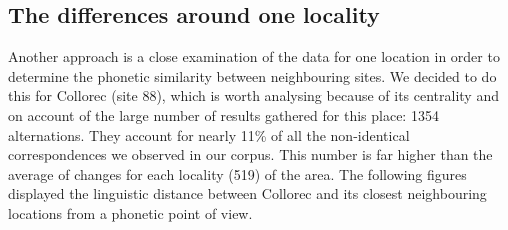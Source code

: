 \documentclass[output=paper]{LSP/langsci}
\begin{document}
\subsection[The differences around one locality]{The differences around one locality}

Another approach is a close examination of the data for one location in order to determine the phonetic similarity between neighbouring sites. We decided to do this for Collorec (site 88), which is worth analysing because of its centrality and on account of the large number of results gathered for this place: 1354 alternations. They account for nearly 11\% of all the non-identical correspondences we observed in our corpus. This number is far higher than the average of changes for each locality (519) of the area. The following figures displayed the linguistic distance between Collorec and its closest neighbouring locations from a phonetic point of view.

\begin{table}
\caption{Number of differences to neighbouring sites around Collorec (site 88)}
\label{tab:8}
\end{table}
\end{document}
